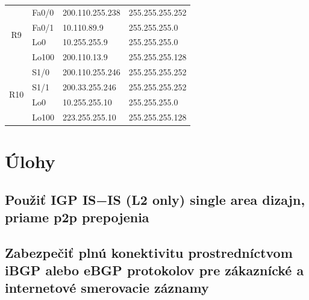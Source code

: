 \documentclass[12pt,twoside,a4paper]{report}
\begin{document}
\begin{table}[!htbp]
\begin{tabular}{|c|l|l|l|}
\multirow{4}{*}{R9}  & Fa0/0                                   & 200.110.255.238                         & 255.255.255.252                     \\ \cline{2-4} 
                     & Fa0/1                                   & 10.110.89.9                             & 255.255.255.0                       \\ \cline{2-4} 
                     & Lo0                                     & 10.255.255.9                            & 255.255.255.0                       \\ \cline{2-4} 
                     & Lo100                                   & 200.110.13.9                            & 255.255.255.128                     \\ \hline
\multirow{4}{*}{R10} & S1/0                                    & 200.110.255.246                         & 255.255.255.252                     \\ \cline{2-4} 
                     & S1/1                                    & 200.33.255.246                          & 255.255.255.252                     \\ \cline{2-4} 
                     & Lo0                                     & 10.255.255.10                           & 255.255.255.0                       \\ \cline{2-4} 
                     & Lo100                                   & 223.255.255.10                          & 255.255.255.128                     \\ \hline
\end{tabular}
\end{table}


\newpage

\section{Úlohy}
\subsection{Použiť IGP IS−IS (L2 only) single area dizajn, priame p2p prepojenia}
\subsection{Zabezpečiť plnú konektivitu prostredníctvom iBGP alebo eBGP protokolov pre zákaznícké a internetové smerovacie záznamy}
\end{document}
